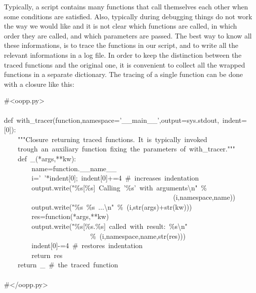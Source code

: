 \documentclass[10pt,english]{article}
\begin{document}
Typically, a script contains many functions that call themselves each
other when some conditions are satisfied. Also, typically during
debugging things do not work the way we would like and it is not
clear which functions are called, in which order they are called,
and which parameters are passed. The best way to know all these
informations, is to trace the functions in our script, and to write
all the relevant informations in a log file. In order to keep the
distinction between the traced functions and the original one, it
is convenient to collect all the wrapped functions in a separate dictionary. 
The tracing of a single function can be done with a closure 
like this:
\begin{ttfamily}\begin{flushleft}
\mbox{{\#}<oopp.py>}\\
\mbox{}\\
\mbox{def~with{\_}tracer(function,namespace='{\_}{\_}main{\_}{\_}',output=sys.stdout,~indent=[0]):}\\
\mbox{~~~~"""Closure~returning~traced~functions.~It~is~typically~invoked}\\
\mbox{~~~~trough~an~auxiliary~function~fixing~the~parameters~of~with{\_}tracer."""}\\
\mbox{~~~~def~{\_}(*args,**kw):}\\
\mbox{~~~~~~~~name=function.{\_}{\_}name{\_}{\_}}\\
\mbox{~~~~~~~~i='~'*indent[0];~indent[0]+=4~{\#}~increases~indentation}\\
\mbox{~~~~~~~~output.write("{\%}s[{\%}s]~Calling~'{\%}s'~with~arguments{\textbackslash}n"~{\%}~}\\
\mbox{~~~~~~~~~~~~~~~~~~~~~~~~~~~~~~~~~~~~~~~~~~~~~~~~~(i,namespace,name))}\\
\mbox{~~~~~~~~output.write("{\%}s~{\%}s~...{\textbackslash}n"~{\%}~(i,str(args)+str(kw)))}\\
\mbox{~~~~~~~~res=function(*args,**kw)}\\
\mbox{~~~~~~~~output.write("{\%}s[{\%}s.{\%}s]~called~with~result:~{\%}s{\textbackslash}n"}\\
\mbox{~~~~~~~~~~~~~~~~~~~~~~~~~{\%}~(i,namespace,name,str(res)))}\\
\mbox{~~~~~~~~indent[0]-=4~{\#}~restores~indentation}\\
\mbox{~~~~~~~~return~res}\\
\mbox{~~~~return~{\_}~{\#}~the~traced~function}\\
\mbox{}\\
\mbox{{\#}</oopp.py>}
\end{flushleft}\end{ttfamily}
\end{document}

